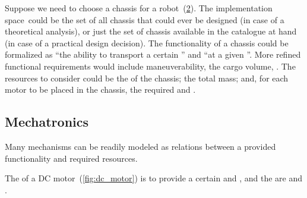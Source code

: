 \begin{figure}[h]
    \centering
    \caption{}
    \label{fig:motor_evalexec}
\end{figure}

\begin{example}
    \label{exa:chassis}
    Suppose we need to choose a chassis for a robot~(\cref{fig:gmcdp_chassis_eval}).
    The implementation space~\impsp could be the set of all chassis that could ever be designed (in case of a theoretical analysis),
    or just the set of chassis available in the catalogue at hand (in case of a practical design decision).
    The functionality of a chassis could be formalized as ``the ability to transport a certain '' and ``at a given ''.
    More refined functional requirements would include maneuverability, the cargo volume, \etc.
    The resources to consider could be the  of the chassis; the total mass;
    and, for each motor to be placed in the chassis, the required  and .
\end{example}

\begin{figure}[h]
    \centering
    \caption{}
    \label{fig:gmcdp_chassis_eval}
\end{figure}




\subsection{Mechatronics}
Many mechanisms can be readily modeled as relations between a provided functionality and required resources.

\begin{example}
    The  of a DC motor~(\cref{fig:dc_motor}) is to provide a certain  and , and the  are  and .
\end{example}


